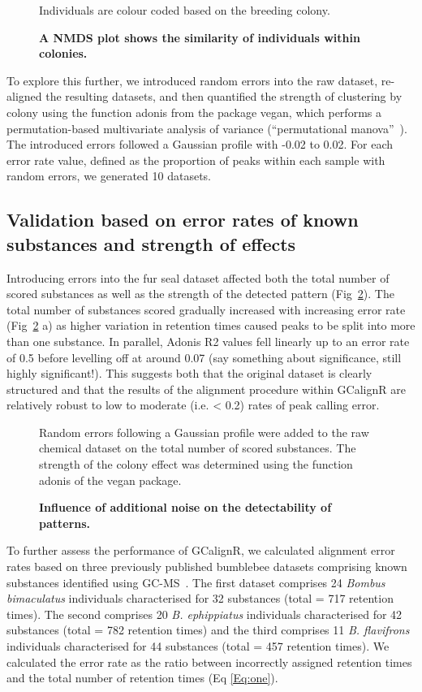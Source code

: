 \documentclass[10pt,letterpaper]{article}
\begin{document}
\begin{figure}[htbp]
\centering
\caption{\textbf{A NMDS plot shows the similarity of individuals within colonies.}}
Individuals are colour coded based on the breeding colony. 
\label{Fig:Fig5}
\end{figure} 

To explore this further, we introduced random errors into the raw dataset, re-aligned the resulting datasets, and then quantified the strength of clustering by colony using the function adonis from the package vegan, which performs a permutation-based multivariate analysis of variance (“permutational manova”~\cite{Anderson.2001}). The introduced errors followed a Gaussian profile with -0.02 to 0.02. For each error rate value, defined as the proportion of peaks within each sample with random errors, we generated 10 datasets.

\subsection*{Validation based on error rates of known substances and  strength of effects}
Introducing errors into the fur seal dataset affected both the total number of scored substances as well as the strength of the detected pattern (Fig~\ref{Fig:Fig6}). The total number of substances scored gradually increased with increasing error rate (Fig~\ref{Fig:Fig6} a) as higher variation in retention times caused peaks to be split into more than one substance.  In parallel, Adonis R2 values fell linearly up to an error rate of 0.5 before levelling off at around 0.07 (say something about significance, still highly significant!).  This suggests both that the original dataset is clearly structured and that the results of the alignment procedure within GCalignR are relatively robust to low to moderate (i.e. < 0.2) rates of peak calling error.

\begin{figure}[htbp]
\centering
\caption{\textbf{Influence of additional noise on the detectability of patterns.}}
Random errors following a Gaussian profile were added to the raw chemical dataset on the total number of scored substances. The strength of the colony effect was determined using the function adonis of the vegan package.
\label{Fig:Fig6}
\end{figure} 

To further assess the performance of GCalignR, we calculated alignment error rates based on three previously published bumblebee datasets comprising known substances identified using GC-MS~\cite{Dellicour.2013}. The first dataset comprises 24 \textit{Bombus bimaculatus} individuals characterised for 32 substances (total = 717 retention times).  The second comprises 20 \textit{B. ephippiatus} individuals characterised for 42 substances (total = 782 retention times) and the third comprises 11 \textit{B. flavifrons} individuals characterised for 44 substances (total = 457 retention times). We calculated the error rate as the ratio between incorrectly assigned retention times and the total number of retention times (Eq \eqref{Eq:one}).
\end{document}
